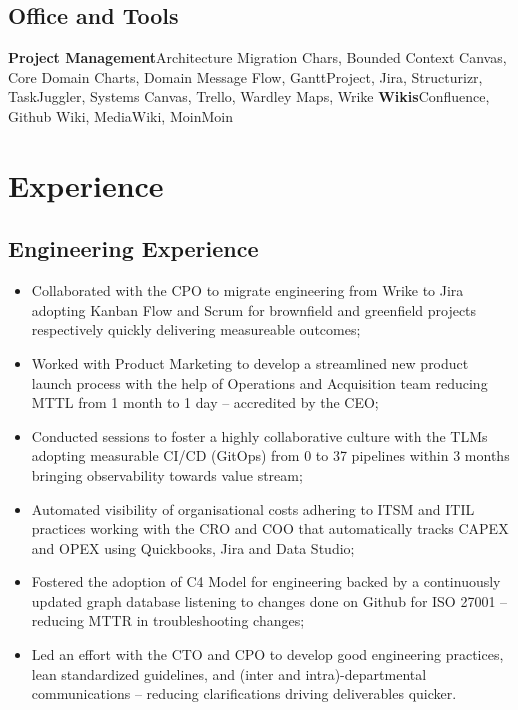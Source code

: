 \documentclass[11pt,a4paper,nolmodern,colorlinks=true,linkcolor=true]{moderncv}
\begin{document}
\subsection{Office and Tools}
           {\textbf{Project Management}}{Architecture Migration Chars, Bounded Context Canvas, Core Domain Charts, Domain Message Flow, GanttProject, Jira, Structurizr, TaskJuggler, Systems Canvas, Trello, Wardley Maps, Wrike}
           {\textbf{Wikis}}{Confluence, Github Wiki, MediaWiki, MoinMoin}

\newpage

\section{Experience}
\subsection{Engineering Experience}


%
  {
    \begin{itemize}
      \item Collaborated with the CPO to migrate engineering from Wrike to Jira adopting Kanban Flow  and Scrum for brownfield and greenfield projects respectively quickly delivering measureable outcomes;
      \item Worked with Product Marketing to develop a streamlined new product launch process with the help of Operations and Acquisition team reducing MTTL from 1 month to 1 day -- accredited by the CEO;
      \item Conducted sessions to foster a highly collaborative culture with the TLMs adopting measurable CI/CD (GitOps) from 0 to 37 pipelines within 3 months bringing observability towards value stream;
      \item Automated visibility of organisational costs adhering to ITSM and ITIL practices working with the CRO and COO that automatically tracks CAPEX and OPEX using Quickbooks, Jira and Data Studio;
      \item Fostered the adoption of C4 Model for engineering backed by a continuously updated graph database listening to changes done on Github for ISO 27001 -- reducing MTTR in troubleshooting changes;
      \item Led an effort with the CTO and CPO to develop good engineering practices, lean standardized guidelines, and (inter and intra)-departmental communications -- reducing clarifications driving deliverables quicker.
    \end{itemize}
}
\end{document}
